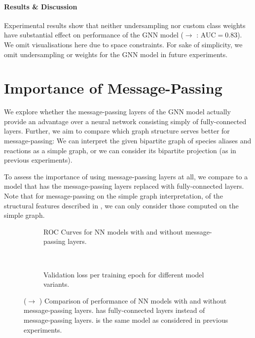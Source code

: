 \documentclass[
	fontsize=10pt, %
	twoside=false, %
	secnumdepth=1, %
  toc=indentunnumbered %
]{kaobook}
\begin{document}
\paragraph{Results \& Discussion} Experimental results show that neither
undersampling nor custom class weights have substantial effect on performance of
the GNN model (\ADLast $\rightarrow$ \PDMap: AUC$=0.83$).
We omit visualisations here due to space constraints.
For sake of simplicity, we omit undersampling or weights for the GNN model in future experiments.



\section{Importance of Message-Passing}

We explore whether the message-passing layers of the GNN model actually provide
an advantage over a neural network
consisting simply of fully-connected layers. Further, we aim to compare which
graph structure serves better for message-passing: We can interpret the given
bipartite graph of species aliases and reactions as a simple graph, or we can
consider its bipartite projection (as in previous experiments).

To assess the importance of using message-passing layers at all, we compare to a
model that has the message-passing layers replaced with fully-connected layers.
Note that for message-passing on the simple graph interpretation, of the
structural features described in , we can only
consider those computed on the simple graph.

\begin{figure}[h]
  \centering
  \begin{subfigure}[h]{0.48\linewidth}
    \caption{ROC Curves for NN models with and without message-passing layers.}
  \end{subfigure}
  ~~
  \begin{subfigure}[h]{0.48\linewidth}
    \caption{Validation loss per training epoch for different model variants.}
  \end{subfigure}
  \caption{(\ADLast $\rightarrow$ \PDMap) Comparison of performance of NN models
    with and without message-passing layers.  has
    fully-connected layers instead of message-passing layers.
     is the same model as considered in previous
    experiments. }
  \label{fig:importance-message-passing}
\end{figure}
\end{document}
